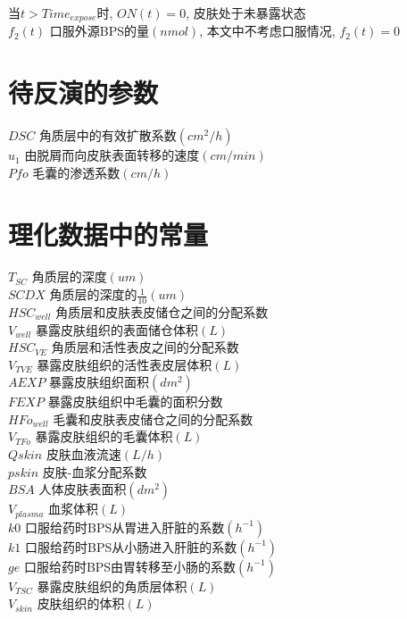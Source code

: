 \documentclass[a4paper,punct=banjiao,twoside]{ctexrep}
\theoremstyle{plain}
\theoremstyle{definition}
\theoremstyle{remark}
\begin{document}
\hfill 当$t> Time_{expose}$时, $ON(t)=0$, 皮肤处于未暴露状态\\
$f_2(t)$ {\hfill  口服外源BPS的量$(nmol)$, 本文中不考虑口服情况, $f_2(t)=0$}\\

\section*{待反演的参数}
\noindent$DSC$ {\hfill  角质层中的有效扩散系数$(cm^2/h)$}\\
$u_1$ {\hfill  由脱屑而向皮肤表面转移的速度$(cm/min)$}\\
$Pfo$ {\hfill  毛囊的渗透系数$(cm/h)$}

\section*{理化数据中的常量}
\noindent$T_{SC}$ {\hfill  角质层的深度$(um)$}\\
$SCDX$ {\hfill  角质层的深度的$\frac{1}{10}(um)$}\\
$HSC_{well}$ {\hfill  角质层和皮肤表皮储仓之间的分配系数}\\
$V_{well}$ {\hfill  暴露皮肤组织的表面储仓体积$(L)$}\\
$HSC_{VE}$ {\hfill  角质层和活性表皮之间的分配系数}\\
$V_{TVE}$ {\hfill  暴露皮肤组织的活性表皮层体积$(L)$}\\
$AEXP $ {\hfill  暴露皮肤组织面积$ (dm^2)$}\\
$ FEXP$ {\hfill  暴露皮肤组织中毛囊的面积分数}\\
$HFo_{well}$ {\hfill  毛囊和皮肤表皮储仓之间的分配系数}\\
$V_{TFo}$ {\hfill  暴露皮肤组织的毛囊体积$(L)$}\\
$ Qskin$ {\hfill  皮肤血液流速$(L/h) $}\\
$ pskin$ {\hfill  皮肤-血浆分配系数}\\
$ BSA$ {\hfill  人体皮肤表面积$(dm^2) $}\\
$V_{plasma}$ {\hfill  血浆体积$(L)$}\\
$k0 $ {\hfill  口服给药时BPS从胃进入肝脏的系数$(h^{-1})$}\\
$k1 $ {\hfill  口服给药时BPS从小肠进入肝脏的系数$(h^{-1})$}\\
$ ge$ {\hfill  口服给药时BPS由胃转移至小肠的系数$(h^{-1})$}\\
$V_{TSC}$ {\hfill  暴露皮肤组织的角质层体积$(L)$}\\
$V_{skin}$ {\hfill  皮肤组织的体积$(L)$}\\
\end{document}
